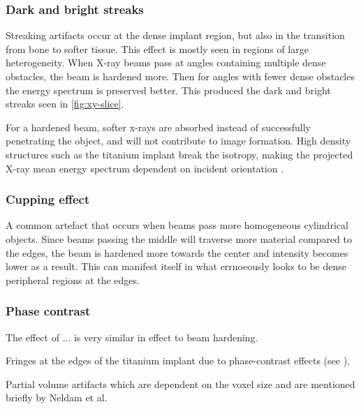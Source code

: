 \subsubsection{Dark and bright streaks}

Streaking artifacts occur at the dense implant region, but also in the transition from bone to softer
tissue. This effect is mostly seen in regions of large heterogeneity. When X-ray beams pass at angles
containing multiple dense obstacles, the beam is hardened more. Then for angles with fewer dense
obstacles the energy spectrum is preserved better. This produced the dark and bright streaks seen in
\cref{fig:xy-slice}.

For a hardened beam, softer x-rays are absorbed instead of successfully penetrating the object,
and will not contribute to image formation. High density structures such as the titanium implant
break the isotropy, making the projected X-ray mean energy spectrum dependent on incident orientation
\citep{srnoise}.

\subsubsection{Cupping effect}

A common artefact that occurs when beams pass more homogeneous cylindrical objects. Since beams
passing the middle will traverse more material compared to the edges, the beam is hardened more
towards the center and intensity becomes lower as a result. This can manifest itself in what
errnoeously looks to be dense peripheral regions at the edges.

\subsubsection{Phase contrast}

The effect of ... is very similar in effect to beam hardening.

Fringes at the edges of the
titanium implant due to phase-contrast effects (see \citep{srnoise}),

Partial volume artifacts which are dependent on the voxel size and are
mentioned briefly by Neldam et al.

